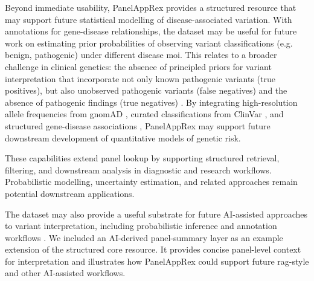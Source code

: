 Beyond immediate usability, PanelAppRex provides a structured resource that may support future statistical modelling of disease-associated variation. 
With annotations for gene-disease relationships, the dataset may be useful for future work on estimating prior probabilities of observing variant classifications (e.g. benign, pathogenic) under different disease \ac{moi}. 
This relates to a broader challenge in clinical genetics: the absence of principled priors for variant interpretation that incorporate not only known pathogenic variants (true positives), but also unobserved pathogenic variants (false negatives) and the absence of pathogenic findings (true negatives) \cite{hannah_using_2024, zschocke_mendelian_2023}. 
By integrating high-resolution allele frequencies from gnomAD \cite{karczewski2020mutational}, curated classifications from ClinVar \cite{landrum_clinvar_2018}, and structured gene-disease associations \cite{martin_panelapp_2019}, 
PanelAppRex may support future downstream development of quantitative models of genetic risk.

These capabilities extend panel lookup by supporting structured retrieval, filtering, and downstream analysis in diagnostic and research workflows. 
Probabilistic modelling, uncertainty estimation, and related approaches remain potential downstream applications.

The dataset may also provide a useful substrate for future AI-assisted approaches to variant interpretation, including probabilistic inference and annotation workflows
\cite{jumper_highly_2021, cheng_accurate_2023}.
We included an AI-derived panel-summary layer as an example extension of the structured core resource. It provides concise panel-level context for interpretation and illustrates how PanelAppRex could support future \ac{rag}-style and other AI-assisted workflows. 

